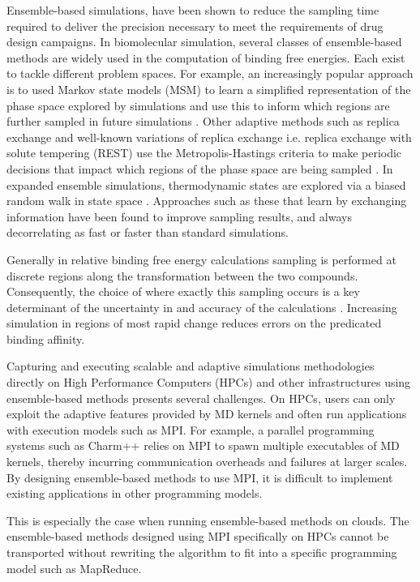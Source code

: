 Ensemble-based simulations, have been shown to reduce the sampling time 
required to deliver the precision necessary to meet the requirements of 
drug design campaigns. In biomolecular simulation, several classes of 
ensemble-based methods are widely used in the computation of binding free 
energies. Each exist to tackle different problem spaces. For example, an 
increasingly popular approach is to used Markov state models (MSM) to learn a 
simplified representation of the phase space explored by simulations and use 
this to inform which regions are further sampled in future simulations 
\cite{Bowman2010}. Other adaptive methods such as replica exchange and 
well-known variations of replica exchange i.e. replica exchange with solute 
tempering (REST) use the Metropolis-Hastings criteria to make periodic decisions 
that impact which regions of the phase space are being sampled 
\cite{Earl2005, Hritz2008, Kim2012}. In expanded ensemble simulations, 
thermodynamic states are explored via a biased random walk in state space 
\cite{Lyubartsev1992}. Approaches such as these that learn by exchanging 
information have been found to improve sampling results, and always 
decorrelating as fast or faster than standard simulations.

Generally in relative binding free energy calculations sampling is performed at 
discrete regions along the transformation between the two compounds.
Consequently, the choice of where exactly this sampling occurs is a key 
determinant of the uncertainty in and accuracy of the calculations 
\cite{Ruiter2013}. Increasing simulation in regions of most rapid change reduces 
errors on the predicated binding affinity. 

Capturing and executing scalable and adaptive simulations methodologies 
directly on High Performance Computers (HPCs) and other infrastructures using 
ensemble-based methods presents several challenges. On HPCs, users can only  
exploit the adaptive features provided by MD kernels and often run applications with
execution models such as MPI. For example, a parallel programming systems such 
as Charm++ relies on MPI to spawn multiple executables of MD kernels, thereby 
incurring communication overheads and failures at larger scales. By designing 
ensemble-based methods to use MPI, it is difficult to implement existing 
applications in other programming models. 

This is especially the case when running ensemble-based methods on clouds. 
The ensemble-based methods designed using MPI specifically on HPCs cannot be 
transported without rewriting the algorithm to fit into a specific programming 
model such as MapReduce. 

